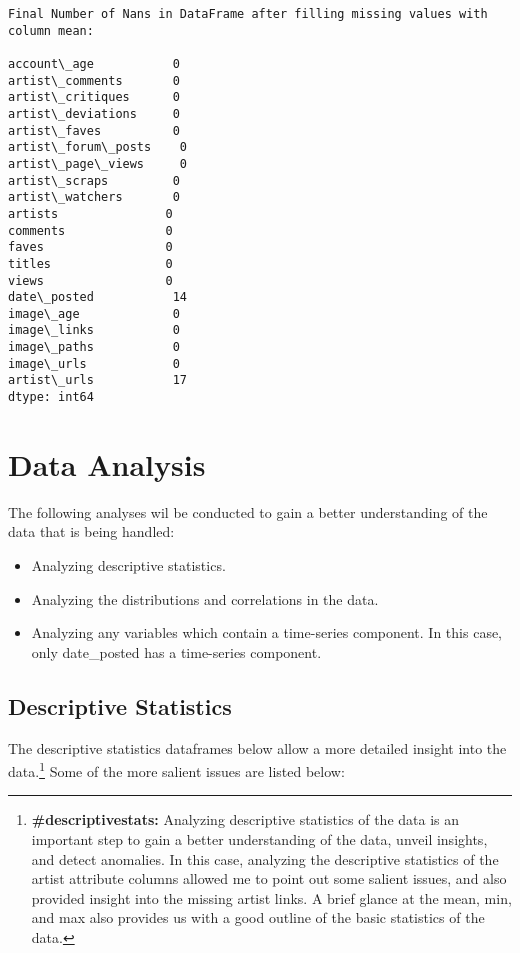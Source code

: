 \documentclass[11pt]{article}
\begin{document}
    \begin{Verbatim}[commandchars=\\\{\},fontsize=\footnotesize]
Final Number of Nans in DataFrame after filling missing values with column mean:

account\_age           0
artist\_comments       0
artist\_critiques      0
artist\_deviations     0
artist\_faves          0
artist\_forum\_posts    0
artist\_page\_views     0
artist\_scraps         0
artist\_watchers       0
artists               0
comments              0
faves                 0
titles                0
views                 0
date\_posted           14
image\_age             0
image\_links           0
image\_paths           0
image\_urls            0
artist\_urls           17
dtype: int64

    \end{Verbatim}
\newpage
    \section{Data Analysis}

The following analyses wil be conducted to gain a better understanding
of the data that is being handled:

\begin{itemize}
\item
  Analyzing descriptive statistics.
\item
  Analyzing the distributions and correlations in the data.
\item
  Analyzing any variables which contain a time-series component. In this
  case, only date\_posted has a time-series component.
\end{itemize}

    \subsection{Descriptive Statistics}

The descriptive statistics dataframes below allow a more detailed
insight into the data.\footnote{\textbf{\#descriptivestats:} Analyzing descriptive statistics of the data is an important step to gain a better understanding of the data, unveil insights, and detect anomalies. In this case, analyzing the descriptive statistics of the artist attribute columns allowed me to point out some salient issues, and also provided insight into the missing artist links. A brief glance at the mean, min, and max also provides us with a good outline of the basic statistics of the data.} Some of the more salient issues are listed below:
\end{document}
